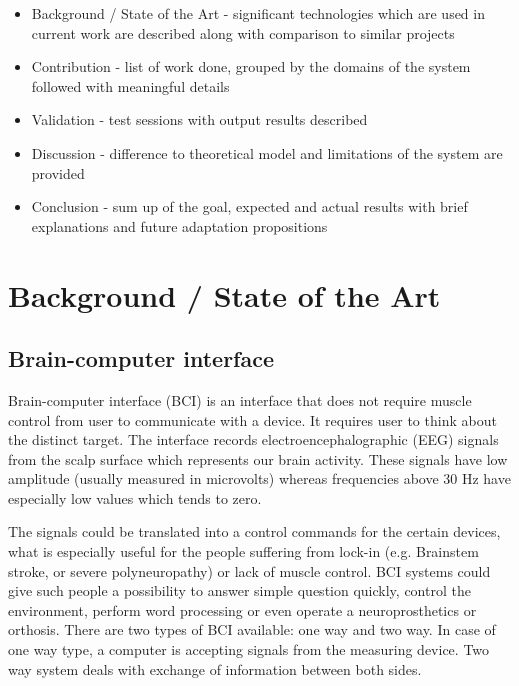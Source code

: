 \documentclass[12pt]{article}
\begin{document}
\begin{itemize}
\item Background / State of the Art - significant technologies which are used in current work are described along with comparison to similar projects
\item Contribution - list of work done, grouped by the domains of the system followed with meaningful details
\item Validation - test sessions with output results described
\item Discussion - difference to theoretical model and limitations of the system are provided
\item Conclusion - sum up of the goal, expected and actual results with brief explanations and future adaptation propositions
\end{itemize}

\newpage
\section{Background / State of the Art} 

\subsection{Brain-computer interface}

Brain-computer interface (BCI) is an interface that does not require muscle control from user to communicate with a device. It requires user to think about the distinct target. The interface records electroencephalographic (EEG) signals from the scalp surface which represents our brain activity. These signals have low amplitude (usually measured in microvolts) whereas frequencies above 30 Hz have especially low values which tends to zero.\cite{bci_vidal}

The signals could be translated into a control commands for the certain devices, what is especially useful for the people suffering from lock-in (e.g. Brainstem stroke, or severe polyneuropathy) or lack of muscle control.  BCI systems could give such people a possibility to answer simple question quickly, control the environment, perform word processing or even operate a neuroprosthetics or orthosis.
There are two types of BCI available: one way and two way. In case of one way type, a computer is accepting signals from the measuring device. Two way system deals with exchange of information between both sides.\cite{bci_shivangi}
\end{document}
